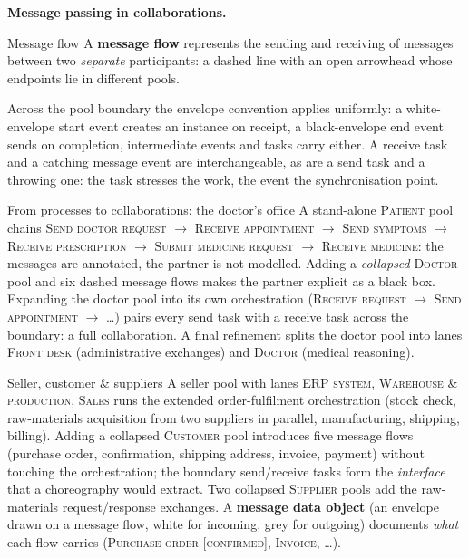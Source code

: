 \textbf{Message passing in collaborations.}
\begin{definitionbox}{Message flow}
A \textbf{message flow} represents the sending and receiving of messages between two \emph{separate} participants: a dashed line with an open arrowhead whose endpoints lie in different pools.
\end{definitionbox}

Across the pool boundary the envelope convention applies uniformly: a white-envelope start event creates an instance on receipt, a black-envelope end event sends on completion, intermediate events and tasks carry either. A receive task and a catching message event are interchangeable, as are a send task and a throwing one: the task stresses the work, the event the synchronisation point.

\begin{examplebox}{From processes to collaborations: the doctor's office}
A stand-alone \textsc{Patient} pool chains \textsc{Send doctor request} $\to$ \textsc{Receive appointment} $\to$ \textsc{Send symptoms} $\to$ \textsc{Receive prescription} $\to$ \textsc{Submit medicine request} $\to$ \textsc{Receive medicine}: the messages are annotated, the partner is not modelled. Adding a \emph{collapsed} \textsc{Doctor} pool and six dashed message flows makes the partner explicit as a black box. Expanding the doctor pool into its own orchestration (\textsc{Receive request} $\to$ \textsc{Send appointment} $\to$ \dots) pairs every send task with a receive task across the boundary: a full collaboration. A final refinement splits the doctor pool into lanes \textsc{Front desk} (administrative exchanges) and \textsc{Doctor} (medical reasoning).
\end{examplebox}

\begin{examplebox}{Seller, customer \& suppliers}
A seller pool with lanes \textsc{ERP system}, \textsc{Warehouse \& production}, \textsc{Sales} runs the extended order-fulfilment orchestration (stock check, raw-materials acquisition from two suppliers in parallel, manufacturing, shipping, billing). Adding a collapsed \textsc{Customer} pool introduces five message flows (purchase order, confirmation, shipping address, invoice, payment) without touching the orchestration; the boundary send/receive tasks form the \emph{interface} that a choreography would extract. Two collapsed \textsc{Supplier} pools add the raw-materials request/response exchanges. %
A \textbf{message data object} (an envelope drawn on a message flow, white for incoming, grey for outgoing) documents \emph{what} each flow carries (\textsc{Purchase order [confirmed]}, \textsc{Invoice}, \dots).
\end{examplebox}

